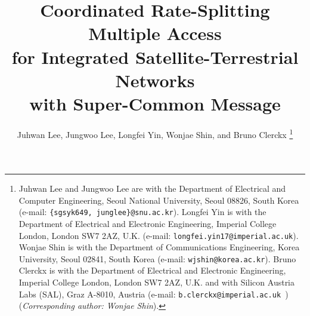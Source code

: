 \documentclass[draftclsnofoot, onecolumn, comsoc, 12pt]{IEEEtran}
\begin{document}
\title{Coordinated Rate-Splitting Multiple Access\\ for Integrated Satellite-Terrestrial Networks \\with  Super-Common Message }


\author{Juhwan Lee,  Jungwoo Lee, Longfei Yin, Wonjae Shin, and Bruno Clerckx
\thanks{Juhwan Lee and Jungwoo Lee are with the Department of Electrical and Computer Engineering, Seoul National University, Seoul 08826, South Korea (e-mail: {\texttt{\{sgsyk649, junglee\}@snu.ac.kr}}). %
Longfei Yin is with the Department of Electrical and Electronic Engineering, Imperial College London, London SW7 2AZ, U.K. (e-mail: \texttt{longfei.yin17@imperial.ac.uk}). 
Wonjae Shin is with the Department of Communications Engineering, Korea University, Seoul 02841, South Korea (e-mail: \texttt{wjshin@korea.ac.kr}). %
Bruno Clerckx is with the Department of Electrical and Electronic Engineering, Imperial College London, London SW7 2AZ, U.K. and with Silicon Austria Labs (SAL), Graz A-8010, Austria (e-mail: \texttt{b.clerckx@imperial.ac.uk%
}) (\textit{Corresponding author: Wonjae Shin}). 
} 

}
{}


\maketitle
\end{document}
